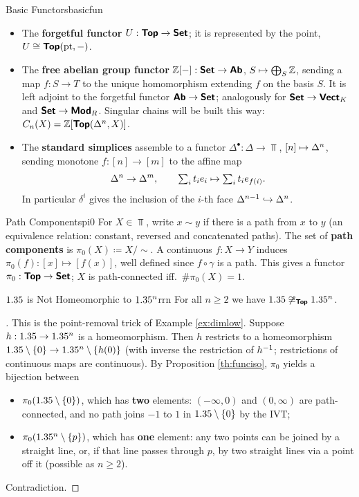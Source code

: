 \newpage

\begin{example}{Basic Functors}{basicfun}
    \begin{itemize}
        \item The \textbf{forgetful functor} $U:\bm{\mathsf{Top}}\to\bm{\mathsf{Set}}$; it is represented by the point, $U\cong\bm{\mathsf{Top}}(\mathrm{pt},-)$.
        \item The \textbf{free abelian group functor} $\mathbb{Z}[-]:\bm{\mathsf{Set}}\to\bm{\mathsf{Ab}}$, $S\mapsto\bigoplus_{S}\mathbb{Z}$, sending a map $f:S\to T$ to the unique homomorphism extending $f$ on the basis $S$. It is left adjoint to the forgetful functor $\bm{\mathsf{Ab}}\to\bm{\mathsf{Set}}$; analogously for $\bm{\mathsf{Set}}\to\bm{\mathsf{Vect}}_K$ and $\bm{\mathsf{Set}}\to\bm{\mathsf{Mod}}_R$. Singular chains will be built this way: $C_n(X)=\mathbb{Z}[\bm{\mathsf{Top}}(\Delta^{n},X)]$.
        \item The \textbf{standard simplices} assemble to a functor $\Delta^\bullet:\Delta\to\Top$, $[n]\mapsto\Delta^{n}$, sending monotone $f:[n]\to[m]$ to the affine map \[
        \Delta^{n}\to\Delta^{m},\qquad \textstyle\sum_{i}t_ie_i\mapsto\sum_i t_ie_{f(i)}.
        \]
        In particular $\delta^i$ gives the inclusion of the $i$-th face $\Delta^{n-1}\hookrightarrow\Delta^{n}$.
    \end{itemize}
\end{example}

\begin{definition}{Path Components}{pi0}
    For $X\in\Top$, write $x\sim y$ if there is a path from $x$ to $y$ (an equivalence relation: constant, reversed and concatenated paths). The set of \textbf{path components} is $\pi_0(X)\coloneqq X/{\sim}$. A continuous $f:X\to Y$ induces $\pi_0(f):[x]\mapsto[f(x)]$, well defined since $f\circ\gamma$ is a path. This gives a functor $\pi_0:\bm{\mathsf{Top}}\to\bm{\mathsf{Set}}$; $X$ is path-connected iff.\ $\#\pi_0(X)=1$.
\end{definition}

\begin{proposition}{$1.35$ is Not Homeomorphic to $1.35^n$}{rrn}
    For all $n\geq2$ we have $1.35\not\cong_{\bm{\mathsf{Top}}}1.35^n$.
\end{proposition}
\begin{proof}[]
    This is the point-removal trick of Example \ref{ex:dimlow}. Suppose $h:1.35\to1.35^n$ is a homeomorphism. Then $h$ restricts to a homeomorphism $1.35\setminus\{0\}\to1.35^n\setminus\{h(0)\}$ (with inverse the restriction of $h^{-1}$; restrictions of continuous maps are continuous). By Proposition \ref{th:funciso}, $\pi_0$ yields a bijection between
    \begin{itemize}
        \item $\pi_0(1.35\setminus\{0\})$, which has \textbf{two} elements: $(-\infty,0)$ and $(0,\infty)$ are path-connected, and no path joins $-1$ to $1$ in $1.35\setminus\{0\}$ by the IVT;
        \item $\pi_0(1.35^n\setminus\{p\})$, which has \textbf{one} element: any two points can be joined by a straight line, or, if that line passes through $p$, by two straight lines via a point off it (possible as $n\geq2$).
    \end{itemize}
    Contradiction.
\end{proof}


